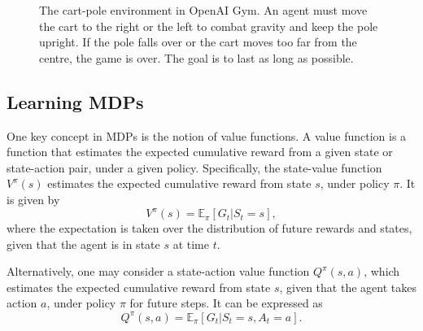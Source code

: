 \begin{figure}
    \centering
    \caption[
        The cart-pole environment in OpenAI Gym.
    ]{
        The cart-pole environment in OpenAI Gym.
        An agent must move the cart to the right or the left to combat gravity and keep the pole upright.
        If the pole falls over or the cart moves too far from the centre, the game is over.
        The goal is to last as long as possible.
    }
    \label{fig:cartpole}
\end{figure}

\subsection{Learning MDPs}
One key concept in MDPs is the notion of value functions.
A value function is a function that estimates the expected cumulative reward from a given state or state-action pair, under a given policy.
Specifically, the state-value function $V^{\pi}(s)$ estimates the expected cumulative reward from state $s$, under policy $\pi$.
It is given by
\begin{equation}
    V^{\pi}(s) = \mathbb{E}_\pi \left[ G_t | S_t = s \right],
\end{equation}
where the expectation is taken over the distribution of future rewards and states, given that the agent is in state $s$ at time $t$.

Alternatively, one may consider a state-action value function $Q^{\pi}(s, a)$, which estimates the expected cumulative reward from state $s$, given that the agent takes action $a$, under policy $\pi$ for future steps.
It can be expressed as
\begin{equation}
    Q^{\pi}(s, a) = \mathbb{E}_\pi \left[ G_t | S_t = s, A_t = a \right].
\end{equation}

